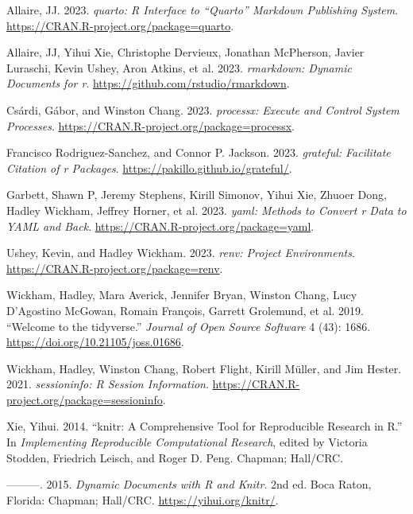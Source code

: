 \documentclass[
  letterpaper,
  DIV=11,
  numbers=noendperiod]{scrartcl}
\newlength{\cslhangindent}
\newenvironment{CSLReferences}[2] %
 {\begin{list}{}{%
  \setlength{\itemindent}{0pt}
  \setlength{\leftmargin}{0pt}
  \setlength{\parsep}{0pt}
  \ifodd #1
   \setlength{\leftmargin}{\cslhangindent}
   \setlength{\itemindent}{-1\cslhangindent}
  \fi
  \setlength{\itemsep}{#2\baselineskip}}}
 {\end{list}}
\begin{document}
\label{refs}
\begin{CSLReferences}{1}{0}
Allaire, JJ. 2023. \emph{{quarto}: R Interface to {``{Quarto}''}
Markdown Publishing System}.
\url{https://CRAN.R-project.org/package=quarto}.

Allaire, JJ, Yihui Xie, Christophe Dervieux, Jonathan McPherson, Javier
Luraschi, Kevin Ushey, Aron Atkins, et al. 2023. \emph{{rmarkdown}:
Dynamic Documents for r}. \url{https://github.com/rstudio/rmarkdown}.

Csárdi, Gábor, and Winston Chang. 2023. \emph{{processx}: Execute and
Control System Processes}.
\url{https://CRAN.R-project.org/package=processx}.

Francisco Rodriguez-Sanchez, and Connor P. Jackson. 2023.
\emph{{grateful}: Facilitate Citation of r Packages}.
\url{https://pakillo.github.io/grateful/}.

Garbett, Shawn P, Jeremy Stephens, Kirill Simonov, Yihui Xie, Zhuoer
Dong, Hadley Wickham, Jeffrey Horner, et al. 2023. \emph{{yaml}: Methods
to Convert r Data to YAML and Back}.
\url{https://CRAN.R-project.org/package=yaml}.

Ushey, Kevin, and Hadley Wickham. 2023. \emph{{renv}: Project
Environments}. \url{https://CRAN.R-project.org/package=renv}.

Wickham, Hadley, Mara Averick, Jennifer Bryan, Winston Chang, Lucy
D'Agostino McGowan, Romain François, Garrett Grolemund, et al. 2019.
{``Welcome to the {tidyverse}.''} \emph{Journal of Open Source Software}
4 (43): 1686. \url{https://doi.org/10.21105/joss.01686}.

Wickham, Hadley, Winston Chang, Robert Flight, Kirill Müller, and Jim
Hester. 2021. \emph{{sessioninfo}: R Session Information}.
\url{https://CRAN.R-project.org/package=sessioninfo}.

Xie, Yihui. 2014. {``{knitr}: A Comprehensive Tool for Reproducible
Research in {R}.''} In \emph{Implementing Reproducible Computational
Research}, edited by Victoria Stodden, Friedrich Leisch, and Roger D.
Peng. Chapman; Hall/CRC.

---------. 2015. \emph{Dynamic Documents with {R} and Knitr}. 2nd ed.
Boca Raton, Florida: Chapman; Hall/CRC. \url{https://yihui.org/knitr/}.


\end{CSLReferences}
\end{document}
